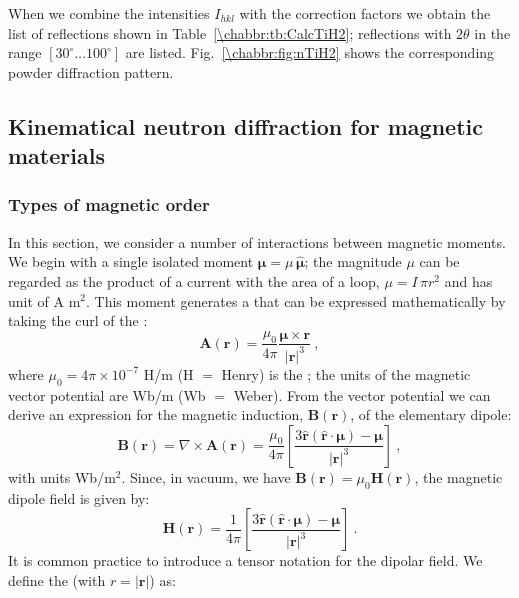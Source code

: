 When we combine the intensities $I_{hkl}$ with the correction factors we obtain the list of reflections shown in Table~\ref{\chabbr:tb:CalcTiH2}; reflections with $2\theta$ in the range $[30^{\circ}\ldots 100^{\circ}]$ are listed.  Fig.~\ref{\chabbr:fig:nTiH2} shows the corresponding powder diffraction pattern.

\subsection{Kinematical neutron diffraction for magnetic materials}\label{\chabbr:sec:nmagnetic}

\subsubsection{Types of magnetic order}
In this section, we consider a number of interactions between magnetic moments. We begin with a single isolated moment $\bm{\mu}=\mu\,\hat{\bm{\mu}}$; the magnitude $\mu$ can be regarded as the product of a current with the area of a loop, $\mu = I\,\pi r^2$ and has unit of A m$^2$.  This moment generates a  that can be expressed mathematically by taking the curl of the :
\begin{equation}
	\mathbf{A}(\mathbf{r}) = \frac{\mu_0}{4\pi}\frac{\bm{\mu}\times\mathbf{r}}{\vert\mathbf{r}\vert^3}\ ,\label{\chabbr:eq:dipolevecpot}
\end{equation}
where $\mu_0=4\pi\times 10^{-7}$ H/m (H $=$ Henry) is the ; the units of the magnetic vector potential are Wb/m (Wb $=$ Weber).  From the vector potential we can derive an expression for the magnetic induction, $\mathbf{B}(\mathbf{r})$, of the elementary dipole:
\begin{equation}
	\mathbf{B}(\mathbf{r})=\nabla\times\mathbf{A}(\mathbf{r}) =\frac{\mu_0}{4\pi}\left[\frac{3\hat{\mathbf{r}}(\hat{\mathbf{r}}\cdot\bm{\mu})-\bm{\mu}}{\vert\mathbf{r}\vert^3}\right]\ ,\label{\chabbr:eq:dipoleB}
\end{equation}
with units Wb/m$^2$. Since, in vacuum, we have $\mathbf{B}(\mathbf{r})=\mu_0\mathbf{H}(\mathbf{r})$, the magnetic dipole field is given by:
\begin{equation}
	\mathbf{H}(\mathbf{r}) = \frac{1}{4\pi}\left[\frac{3\hat{\mathbf{r}}(\hat{\mathbf{r}}\cdot\bm{\mu})-\bm{\mu}}{\vert\mathbf{r}\vert^3}\right]\ .\label{\chabbr:eq:dipoleH}
\end{equation}
It is common practice to introduce a tensor notation for the dipolar field.  We define the  (with $r=\vert\mathbf{r}\vert$) as:

